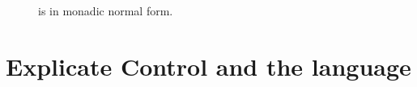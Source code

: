 \documentclass[7x10,nocrop]{TimesAPriori_MIT}%
\begin{document}
\begin{figure}[tp]
{\begin{minipage}{0.96\textwidth}
{\[%
\]
\fi}
\end{minipage}
}
\caption{\LangAllocANF{} is \LangAlloc{} in monadic normal form.}
\label{fig:Lvec-anf-syntax}
\end{figure}


\section{Explicate Control and the \LangCVec{} language}
\label{sec:explicate-control-r3}


\newcommand{\CtupASTRacket}{
\begin{array}{lcl}
\Exp &::= & \LP\key{Allocate} \,\itm{int}\,\itm{type}\RP \\
   &\MID& \VECREF{\Atm}{\INT{\Int}}  \\
   &\MID& \VECSET{\Atm}{\INT{\Int}}{\Atm} \\
   &\MID& \VECLEN{\Atm} \\
   &\MID& \GLOBALVALUE{\Var} \\
\Stmt &::=& \VECSET{\Atm}{\INT{\Int}}{\Atm} \\
    &\MID& \LP\key{Collect} \,\itm{int}\RP 
\end{array}
}
  
\end{document}
